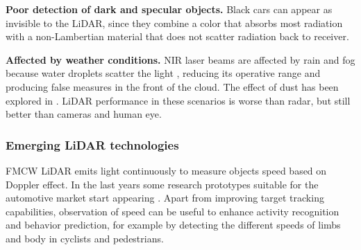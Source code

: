 \documentclass[journal]{IEEEtran}
\begin{document}
\textbf{Poor detection of dark and specular objects.} Black cars
can appear as invisible to the LiDAR, since they combine a color that
absorbs most radiation with a non-Lambertian material that does not scatter
radiation back to receiver.


\textbf{Affected by weather conditions.} NIR laser
beams are affected by rain and fog because water droplets scatter the light 
\cite{Wang2008}, reducing its operative range and producing false measures 
in the front of the cloud. The effect of dust has been
explored in \cite{Phillips2017}. LiDAR performance in these scenarios is 
worse than radar, but still better than cameras and human eye.

\subsubsection{Emerging LiDAR technologies}
\label{sec:03-lidar-emerging}


FMCW LiDAR \cite{Nordin2004} emits light continuously to measure objects speed
based on Doppler effect. In the last years some research prototypes suitable for
the automotive market start appearing \cite{Poulton2016}.
Apart from improving target tracking capabilities, observation of speed can
be useful to enhance activity recognition and behavior prediction, for example 
by detecting the different speeds of limbs and body in cyclists and pedestrians.

\end{document}

